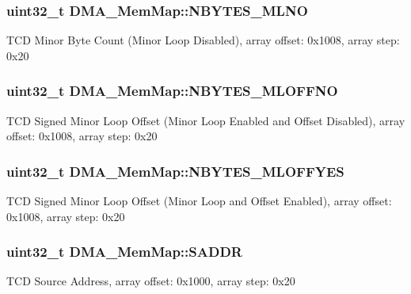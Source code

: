 \subsubsection[{N\+B\+Y\+T\+E\+S\+\_\+\+M\+L\+N\+O}]{\setlength{\rightskip}{0pt plus 5cm}uint32\+\_\+t D\+M\+A\+\_\+\+Mem\+Map\+::\+N\+B\+Y\+T\+E\+S\+\_\+\+M\+L\+N\+O}\label{struct_d_m_a___mem_map_af959fbf83990ff94c7fa02b545b161c2}
T\+C\+D Minor Byte Count (Minor Loop Disabled), array offset\+: 0x1008, array step\+: 0x20 \hypertarget{struct_d_m_a___mem_map_acee1602a05a1ef894cf13144755ade08}{}
\subsubsection[{N\+B\+Y\+T\+E\+S\+\_\+\+M\+L\+O\+F\+F\+N\+O}]{\setlength{\rightskip}{0pt plus 5cm}uint32\+\_\+t D\+M\+A\+\_\+\+Mem\+Map\+::\+N\+B\+Y\+T\+E\+S\+\_\+\+M\+L\+O\+F\+F\+N\+O}\label{struct_d_m_a___mem_map_acee1602a05a1ef894cf13144755ade08}
T\+C\+D Signed Minor Loop Offset (Minor Loop Enabled and Offset Disabled), array offset\+: 0x1008, array step\+: 0x20 \hypertarget{struct_d_m_a___mem_map_aa99ffa54a462f1c42ea1feb2e5420c73}{}
\subsubsection[{N\+B\+Y\+T\+E\+S\+\_\+\+M\+L\+O\+F\+F\+Y\+E\+S}]{\setlength{\rightskip}{0pt plus 5cm}uint32\+\_\+t D\+M\+A\+\_\+\+Mem\+Map\+::\+N\+B\+Y\+T\+E\+S\+\_\+\+M\+L\+O\+F\+F\+Y\+E\+S}\label{struct_d_m_a___mem_map_aa99ffa54a462f1c42ea1feb2e5420c73}
T\+C\+D Signed Minor Loop Offset (Minor Loop and Offset Enabled), array offset\+: 0x1008, array step\+: 0x20 \hypertarget{struct_d_m_a___mem_map_a2c0415fb23ffb715629c58275c606f4e}{}
\subsubsection[{S\+A\+D\+D\+R}]{\setlength{\rightskip}{0pt plus 5cm}uint32\+\_\+t D\+M\+A\+\_\+\+Mem\+Map\+::\+S\+A\+D\+D\+R}\label{struct_d_m_a___mem_map_a2c0415fb23ffb715629c58275c606f4e}
T\+C\+D Source Address, array offset\+: 0x1000, array step\+: 0x20 \hypertarget{struct_d_m_a___mem_map_a576075e4d10859c84e48e7abc1e030aa}{}
